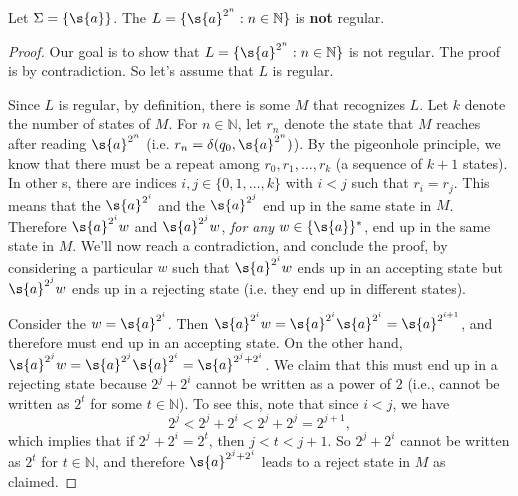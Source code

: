 \begin{flex}
\begin{theorem} \label{theorem:A-unary-non-regular-language}
Let $\Sigma = \{\s{a}\}$. The  $L = \{\s{a}^{2^n}: n \in \mathbb{N}\}$ is \textbf{not} regular.
\end{theorem}
\begin{proof}
Our goal is to show that $L = \{\s{a}^{2^n}: n \in \mathbb{N}\}$ is not regular. The proof is by contradiction. So let's assume that $L$ is regular. 

Since $L$ is regular, by definition, there is some  $M$ that recognizes $L$. Let $k$ denote the number of states of $M$. For $n \in \mathbb{N}$, let $r_n$ denote the state that $M$ reaches after reading $\s{a}^{2^n}$ (i.e. $r_n = \delta(q_0, \s{a}^{2^n})$). By the pigeonhole principle, we know that there must be a repeat among $r_0, r_1,\ldots, r_k$ (a sequence of $k+1$ states). In other s, there are indices $i, j \in \{0,1,\ldots,k\}$ with $i < j$ such that $r_i = r_j$. This means that the  $\s{a}^{2^i}$ and the  $\s{a}^{2^j}$ end up in the same state in $M$. Therefore $\s{a}^{2^i}w$ and $\s{a}^{2^j}w$, \emph{for any}  $w \in \{\s{a}\}^*$, end up in the same state in $M$. We'll now reach a contradiction, and conclude the proof, by considering a particular $w$ such that $\s{a}^{2^i}w$ ends up in an accepting state but $\s{a}^{2^j}w$ ends up in a rejecting state (i.e. they end up in different states). 

Consider the  $w = \s{a}^{2^i}$. Then $\s{a}^{2^i}w = \s{a}^{2^i}\s{a}^{2^i} = \s{a}^{2^{i+1}}$, and therefore must end up in an accepting state. On the other hand, $\s{a}^{2^j}w = \s{a}^{2^j}\s{a}^{2^i} = \s{a}^{2^j + 2^i}$. We claim that this  must end up in a rejecting state because $2^j + 2^i$ cannot be written as a power of $2$ (i.e., cannot be written as $2^t$ for some $t \in \mathbb{N}$). To see this, note that since $i < j$, we have
\[
2^j < 2^j + 2^i < 2^j + 2^j = 2^{j+1},
\]
which implies that if $2^j + 2^i = 2^t$, then $j < t < j+1$. So $2^j + 2^i$ cannot be written as $2^t$ for $t \in \mathbb{N}$, and therefore $\s{a}^{2^j + 2^i}$ leads to a reject state in $M$ as claimed.
\end{proof}
\end{flex}


